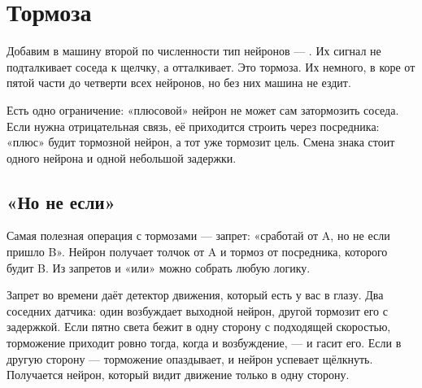 \chapter{Тормоза}

Добавим в машину второй по численности тип нейронов --- . Их сигнал не подталкивает соседа к щелчку, а отталкивает. Это тормоза. Их немного, в коре от пятой части до четверти всех нейронов, но без них машина не ездит.

Есть одно ограничение: «плюсовой» нейрон не может сам затормозить соседа. Если нужна отрицательная связь, её приходится строить через посредника: «плюс» будит тормозной нейрон, а тот уже тормозит цель. Смена знака стоит одного нейрона и одной небольшой задержки.

\section*{«Но не если»}

Самая полезная операция с тормозами --- запрет: «сработай от A, но не если пришло B». Нейрон получает толчок от A и тормоз от посредника, которого будит B. Из запретов и «или» можно собрать любую логику.


Запрет во времени даёт детектор движения, который есть у вас в глазу. Два соседних датчика: один возбуждает выходной нейрон, другой тормозит его с задержкой. Если пятно света бежит в одну сторону с подходящей скоростью, торможение приходит ровно тогда, когда и возбуждение, --- и гасит его. Если в другую сторону --- торможение опаздывает, и нейрон успевает щёлкнуть. Получается нейрон, который видит движение только в одну сторону.

